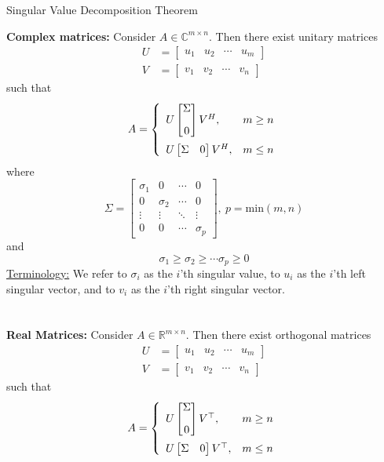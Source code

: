 \documentclass[letterpaper]{article}
\newcommand{\real}{\mathbb R}  %
\newcommand{\cp}{\mathbb C}    %
\begin{document}
{\Large \bf
\begin{center}
Singular Value Decomposition Theorem
\end{center}
}
\textbf{Complex matrices:} Consider $A\in \cp^{m \times n}$. Then there exist unitary matrices
$$\begin{aligned}
U&=\begin{bmatrix}u_1 & u_2 & \cdots & u_m \end{bmatrix} \\
V&=\begin{bmatrix}v_1 & v_2 & \cdots & v_n \end{bmatrix}
\end{aligned}$$
such that
$$A=\left\{\begin{array}{ll}
U\begin{bmatrix} \Sigma \\[2ex] 0 \end{bmatrix}V^H, & m\ge n \vspace{5pt}\\
U\begin{bmatrix} \Sigma & 0 \end{bmatrix}V^H, & m\le n
\end{array}\right.$$
where
$$\Sigma=\left[\begin{array}{cccc} \sigma_1 & 0 & \cdots & 0 \\ 0 & \sigma_2 & \cdots & 0 \\ \vdots & \vdots &\ddots & \vdots \\ 0 & 0 & \cdots & \sigma_{p}\end{array}\right],~p=\text{min}(m,n)$$
and
$$\sigma_1\ge\sigma_2\ge\cdots\sigma_{p}\ge0$$
\noindent \underline{Terminology:} We refer to $\sigma_i$  as the $i$'th singular value, to $u_i$ as the $i$'th left singular vector, and to $v_i$ as the $i$'th  right singular vector. \\
\\
\\
\textbf{Real Matrices:}  Consider $A\in \real^{m \times n}$. Then there exist orthogonal matrices
$$\begin{aligned}
U&=\begin{bmatrix}u_1 & u_2 & \cdots & u_m \end{bmatrix} \\
V&=\begin{bmatrix}v_1 & v_2 & \cdots & v_n \end{bmatrix}
\end{aligned}$$
such that
$$A=\left\{\begin{array}{ll}
U\begin{bmatrix} \Sigma \\[2ex] 0 \end{bmatrix}V^\top, & m\ge n \vspace{5pt}\\
U\begin{bmatrix} \Sigma & 0 \end{bmatrix}V^\top, & m\le n
\end{array}\right.$$
\end{document}
